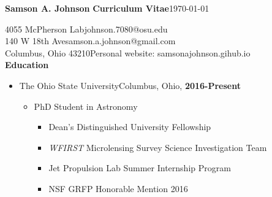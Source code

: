 \documentclass{article}
\begin{document}
\raggedright
{\large\bf{Samson A. Johnson}}\hfill
{\large\bf{Curriculum Vitae}}\hspace{38mm}\today

\noindent\makebox[\linewidth]{\rule{6.5in}{0.4pt}}


\hspace{15mm}4055 McPherson Lab\hfill johnson.7080@osu.edu\\
\hspace{15mm}140 W 18th Ave\hfill samson.a.johnson@gmail.com\\
\hspace{15mm}Columbus, Ohio 43210\hfill Personal website: samsonajohnson.gihub.io\\








{\large{\bf Education}}

\begin{itemize}
\item[] {\large{The Ohio State University}}\hfill Columbus, Ohio, {\bf{2016-Present}}\\
\begin{itemize}
\item PhD Student in Astronomy
\begin{itemize}
\item[] Dean's Distinguished University Fellowship 
\item[] \textit{WFIRST} Microlensing Survey Science Investigation Team
\item[] Jet Propulsion Lab Summer Internship Program
\item[] NSF GRFP Honorable Mention 2016 
\end{itemize}
\end{itemize}
\end{itemize}
\end{document}
